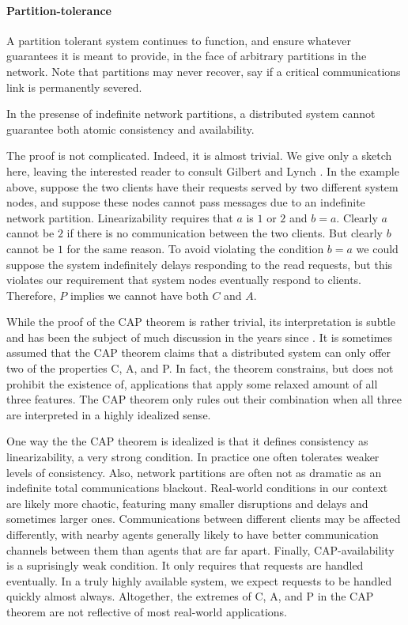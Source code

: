 \paragraph{Partition-tolerance}

A partition tolerant system continues to function, and ensure whatever
guarantees it is meant to provide, in the face of arbitrary partitions
in the network. Note that partitions may never recover, say if a
critical communications link is permanently severed.

\begin{theorem}
In the presense of indefinite network partitions, a distributed system
cannot guarantee both atomic consistency and availability.
\end{theorem}

The proof is not complicated. Indeed, it is almost trivial. We give
only a sketch here, leaving the interested reader to consult Gilbert
and Lynch \cite{2002gilbertlynchCAP}. In the example above, suppose the two clients have
their requests served by two different system nodes, and suppose these
nodes cannot pass messages due to an indefinite network
partition. Linearizability requires that $a$ is $1$ or $2$ and $b =
a$.  Clearly $a$ cannot be $2$ if there is no communication between
the two clients. But clearly $b$ cannot be $1$ for the same reason.
To avoid violating the condition $b = a$ we could suppose the system
indefinitely delays responding to the read requests, but this violates
our requirement that system nodes eventually respond to
clients. Therefore, $P$ implies we cannot have both $C$ and $A$.

While the proof of the CAP theorem is rather trivial, its
interpretation is subtle and has been the subject of much discussion
in the years since \cite{2012CAP12Years}. It is sometimes assumed that
the CAP theorem claims that a distributed system can only offer two of
the properties C, A, and P. In fact, the theorem constrains, but does
not prohibit the existence of, applications that apply some relaxed
amount of all three features. The CAP theorem only rules out their
combination when all three are interpreted in a highly idealized
sense.

One way the the CAP theorem is idealized is that it defines
consistency as linearizability, a very strong condition. In practice
one often tolerates weaker levels of consistency. Also, network
partitions are often not as dramatic as an indefinite total
communications blackout. Real-world conditions in our context are
likely more chaotic, featuring many smaller disruptions and delays and
sometimes larger ones. Communications between different clients may be
affected differently, with nearby agents generally likely to have
better communication channels between them than agents that are far
apart. Finally, CAP-availability is a suprisingly weak condition. It
only requires that requests are handled eventually. In a truly highly
available system, we expect requests to be handled quickly almost
always. Altogether, the extremes of C, A, and P in the CAP theorem are
not reflective of most real-world applications.

